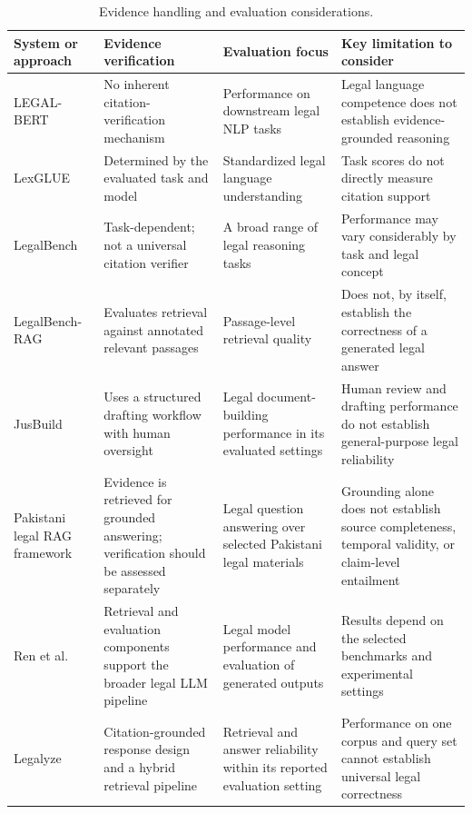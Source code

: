 \begin{table}[tp]
\centering
\caption{Evidence handling and evaluation considerations.}
\label{tab:evid8}
\footnotesize
\setlength{\tabcolsep}{5pt}
\renewcommand{\arraystretch}{1.3}
\begin{tabularx}{\textwidth}{>{\raggedright\arraybackslash}p{2.8cm} >{\raggedright\arraybackslash}X >{\raggedright\arraybackslash}X >{\raggedright\arraybackslash}X}
\toprule
\textbf{System or approach} & \textbf{Evidence verification} & \textbf{Evaluation focus} & \textbf{Key limitation to consider} \\
\midrule
LEGAL-BERT & No inherent citation-verification mechanism & Performance on downstream legal NLP tasks & Legal language competence does not establish evidence-grounded reasoning \\
LexGLUE & Determined by the evaluated task and model & Standardized legal language understanding & Task scores do not directly measure citation support \\
LegalBench & Task-dependent; not a universal citation verifier & A broad range of legal reasoning tasks & Performance may vary considerably by task and legal concept \\
LegalBench-RAG & Evaluates retrieval against annotated relevant passages & Passage-level retrieval quality & Does not, by itself, establish the correctness of a generated legal answer \\
JusBuild & Uses a structured drafting workflow with human oversight & Legal document-building performance in its evaluated settings & Human review and drafting performance do not establish general-purpose legal reliability \\
Pakistani legal RAG framework & Evidence is retrieved for grounded answering; verification should be assessed separately & Legal question answering over selected Pakistani legal materials & Grounding alone does not establish source completeness, temporal validity, or claim-level entailment \\
Ren et al. & Retrieval and evaluation components support the broader legal LLM pipeline & Legal model performance and evaluation of generated outputs & Results depend on the selected benchmarks and experimental settings \\
Legalyze & Citation-grounded response design and a hybrid retrieval pipeline & Retrieval and answer reliability within its reported evaluation setting & Performance on one corpus and query set cannot establish universal legal correctness \\
\bottomrule
\end{tabularx}
\end{table}

